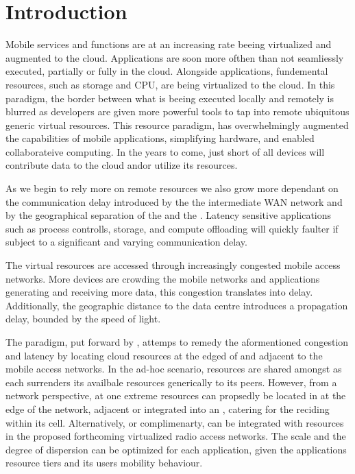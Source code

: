 \section{Introduction}
Mobile services and \ue functions are at an increasing rate beeing virtualized and augmented to the cloud. Applications are soon more ofthen than not seamliessly executed, partially or fully in the cloud. Alongside applications, fundemental \ue resources, such as storage and CPU, are being virtualized to the cloud. In this paradigm, the border between what is beeing executed locally and remotely is blurred as developers are given more powerful tools to tap into remote ubiquitous generic virtual resources. This resource paradigm, has overwhelmingly augmented the capabilities of mobile applications, simplifying hardware, and enabled collaborateive computing. In the years to come, just short of all devices will contribute data to the cloud and\/or utilize its resources.

As we begin to rely more on remote resources we also grow more dependant on the communication delay introduced by the the intermediate WAN network and by the geographical separation of the \ue and the \dc. Latency sensitive applications such as process controlls, storage, and compute offloading will quickly faulter if subject to a significant and varying communication delay.

The virtual resources are accessed through increasingly congested mobile access networks. More devices are crowding the mobile networks and applications generating and receiving more data, this congestion translates into delay. Additionally, the geographic distance to the data centre introduces a propagation delay, bounded by the speed of light.

The \xcloud paradigm, put forward by \cite{chandra2013decentralized,ericsson_akami}, attemps to remedy the aformentioned congestion and latency by locating cloud resources at the edged of and adjacent to the mobile access networks. In the ad-hoc scenario, resources are shared amongst \ues as each \ue surrenders its availbale resources generically to its peers. However, from a network perspective, at one extreme \dc resources can propsedly be located in at the edge of the network, adjacent or integrated into an \rbs, catering for the \ues reciding within its cell. Alternatively, or complimenarty, \dcs can be integrated with resources in the proposed forthcoming virtualized radio access networks. The scale and the degree of dispersion can be optimized for each application, given the applications resource tiers and its users mobility behaviour.

